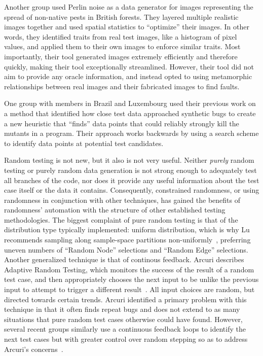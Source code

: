 Another group used Perlin noise as a data generator for images representing the spread of non-native pests in British forests. They layered multiple realistic images together and used spatial statistics to ``optimize'' their images. In other words, they identified traits from real test images, like a histogram of pixel values, and applied them to their own images to enforce similar traits. Most importantly, their tool generated images extremely efficiently and therefore quickly, making their tool exceptionally streamlined. However, their tool did not aim to provide any oracle information, and instead opted to using metamorphic relationships between real images and their fabricated images to find faults.

One group with members in Brazil and Luxembourg used their previous work on a method that identified how close test data approached synthetic bugs to create a new heuristic that ``finds'' data points that could reliably strongly kill the mutants in a program. Their approach works backwards by using a search scheme to identify data points at potential test candidates.


Random testing is not new, but it also is not very useful. Neither \textit{purely} random testing or purely random data generation is not strong enough to adequately test all branches of the code, nor does it provide any useful information about the test case itself or the data it contains. Consequently, constrained randomness, or using randomness in conjunction with other techniques, has gained the benefits of randomness' automation with the structure of other established testing methodologies. The biggest complaint of pure random testing is that of the distribution type typically implemented: uniform distribution, which is why Lu recommends sampling along sample-space partitions non-uniformly~\cite{Lu:2018:URS:3184558.3186240}, preferring uneven numbers of ``Random Node'' selections and ``Random Edge'' selections. Another generalized technique is that of continous feedback. Arcuri describes Adaptive Random Testing, which monitors the success of the result of a random test case, and then appropriately chooses the next input to be unlike the previous input to attempt to trigger a different result~\cite{Arcuri:2011:ART:2001420.2001452}. All input choices are random, but directed towards certain trends. Arcuri identified a primary problem with this technique in that it often finds repeat bugs and does not extend to as many situations that pure random test cases otherwise could have found. However, several recent  groups similarly use a continuous feedback loops to identify the next test cases but with greater control over random stepping so as to address Arcuri's concerns~\cite{Yatoh:2015:FRT:2771783.2771805,Hughes:2016:FMB:2896921.2896928,Sabor:2015:ART:2819261.2819271}.

